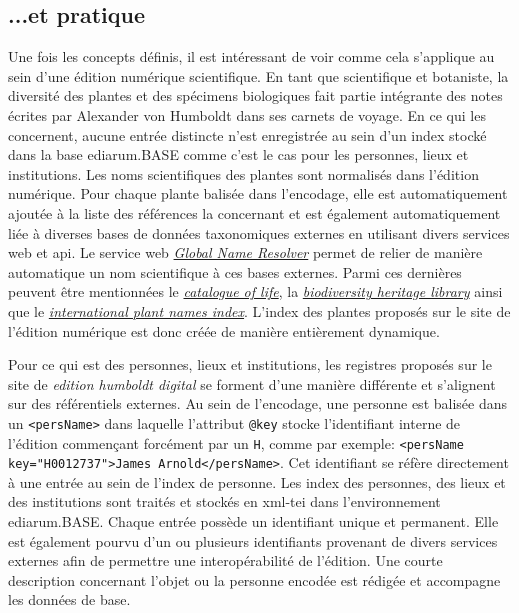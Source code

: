 \documentclass[a4paper, 12pt, twoside]{book}
\begin{document}
\subsection{...et pratique}
\label{subsec:miseEnPratique}
Une fois les concepts définis, il est intéressant de voir comme cela s'applique au sein d'une édition numérique scientifique. En tant que scientifique et botaniste, la diversité des plantes et des spécimens biologiques fait partie intégrante des notes écrites par Alexander von Humboldt dans ses carnets de voyage. En ce qui les concernent, aucune entrée distincte n'est enregistrée au sein d'un index stocké dans la base ediarum.BASE comme c'est le cas pour les personnes, lieux et institutions. Les noms scientifiques des plantes sont normalisés dans l'édition numérique. Pour chaque plante balisée dans l'encodage, elle est automatiquement ajoutée à la liste des références la concernant et est également automatiquement liée à diverses bases de données taxonomiques externes en utilisant divers services web et \gls{api}. Le service web \href{https://resolver.globalnames.org/}{\textit{Global Name Resolver}} permet de relier de manière automatique un nom scientifique à ces bases externes. Parmi ces dernières peuvent être mentionnées le \textit{\href{https://www.catalogueoflife.org/}{catalogue of life}}, la \textit{\href{https://www.biodiversitylibrary.org/}{biodiversity heritage library}} ainsi que le \textit{\href{https://www.ipni.org/}{international plant names index}}. L'index des plantes proposés sur le site de l'édition numérique est donc créée de manière entièrement dynamique.

Pour ce qui est des personnes, lieux et institutions, les registres proposés sur le site de \textit{edition humboldt digital} se forment d'une manière différente et s'alignent sur des référentiels externes. Au sein de l'encodage, une personne est balisée dans un \texttt{<persName>} dans laquelle l'attribut \texttt{@key} stocke l'identifiant interne de l'édition commençant forcément par un \texttt{H}, comme par exemple: \texttt{<persName key="H0012737">James Arnold</persName>}. Cet identifiant se réfère directement à une entrée au sein de l'index de personne. Les index des personnes, des lieux et des institutions sont traités et stockés en \gls{xml}-\gls{tei} dans l'environnement ediarum.BASE. Chaque entrée possède un identifiant unique et permanent. Elle est également pourvu d'un ou plusieurs identifiants provenant de divers services externes afin de permettre une interopérabilité de l'édition. Une courte description concernant l'objet ou la personne encodée est rédigée et accompagne les données de base.
\end{document}
